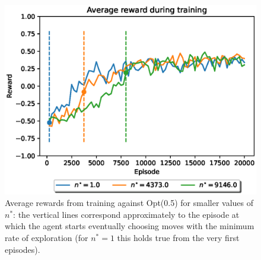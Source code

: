 \documentclass[10pt]{IEEEtran}
\begin{document}
\begin{figure}[H]
    \centering
    \includegraphics[width = 0.85\linewidth]{code/figures/rewards_n_star_second.eps}
    \caption{Average rewards from training against Opt(0.5) for smaller values of $n^{*}$: the vertical lines correspond approximately to the episode at which the agent starts eventually choosing moves with the minimum rate of exploration (for $n^{*} = 1$ this holds true from the very first episodes).}
    \label{secondplot_question2}
\end{figure}
\end{document}

